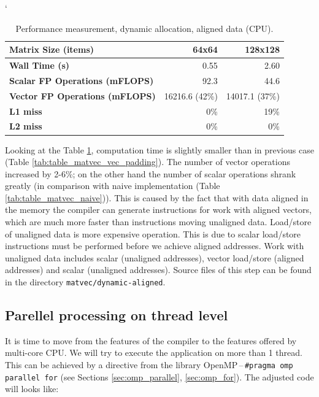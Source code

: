\begin{table}[ht]
\catcode`
\begin{center}
\begin{tabular}{| l | r | r |} \hline
\textbf{Matrix Size (items)} & 64x64 & 128x128\\ \hline
\textbf{Wall Time (s)} & 0.55 & 2.60\\ \hline
\textbf{Scalar FP Operations (mFLOPS)} & 92.3 & 44.6\\ \hline
\textbf{Vector FP Operations (mFLOPS)} & 16216.6 (42\%) & 14017.1 (37\%)\\ \hline
\textbf{L1 miss} & 0\% & 19\%\\ \hline
\textbf{L2 miss} & 0\% & 0\%\\ \hline
\end{tabular}
\caption{Performance measurement, dynamic allocation, aligned data (CPU).}
\label{tab:table_matvec_dyn_align}
\end{center}
\end{table}

Looking at the Table \ref{tab:table_matvec_dyn_align}, computation time is slightly smaller than in previous case (Table \ref{tab:table_matvec_vec_padding}). The number of vector operations increased by 2-6\%; on the other hand the number of scalar operations shrank greatly (in comparison with naive implementation (Table \ref{tab:table_matvec_naive})). This is caused by the fact that with data aligned in the memory the compiler can generate instructions for work with aligned vectors, which are much more faster than instructions moving unaligned data. Load/store of unaligned data is more expensive operation. This is due to scalar load/store instructions must be performed before we achieve aligned addresses. Work with unaligned data includes scalar  (unaligned addresses), vector load/store (aligned addresses) and scalar  (unaligned addresses). Source files of this step can be found in the directory \texttt{matvec/dynamic-aligned}.

\subsection{Parellel processing on thread level}
It is time to move from the features of the compiler to the features offered by multi-core CPU. We will try to execute the application on more than 1 thread. This can be achieved by a directive from the library OpenMP\,--\,\texttt{\#pragma omp parallel for} (see Sections \ref{sec:omp_parallel}, \ref{sec:omp_for}). The adjusted code will looks like:

